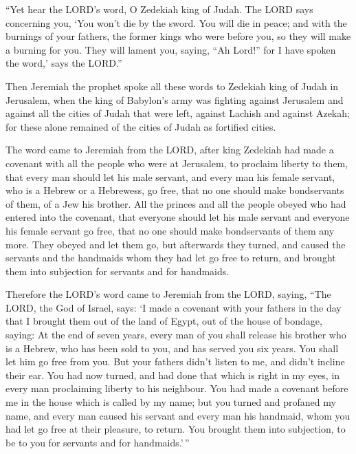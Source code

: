  ``Yet hear the LORD's word, O Zedekiah king of Judah. The
LORD says concerning you, `You won't die by the sword.  You
will die in peace; and with the burnings of your fathers, the former
kings who were before you, so they will make a burning for you. They
will lament you, saying, ``Ah Lord!'' for I have spoken the word,' says
the LORD.''

 Then Jeremiah the prophet spoke all these words to Zedekiah
king of Judah in Jerusalem,  when the king of Babylon's army
was fighting against Jerusalem and against all the cities of Judah that
were left, against Lachish and against Azekah; for these alone remained
of the cities of Judah as fortified cities.

 The word came to Jeremiah from the LORD, after king
Zedekiah had made a covenant with all the people who were at Jerusalem,
to proclaim liberty to them,  that every man should let his
male servant, and every man his female servant, who is a Hebrew or a
Hebrewess, go free, that no one should make bondservants of them, of a
Jew his brother.  All the princes and all the people obeyed
who had entered into the covenant, that everyone should let his male
servant and everyone his female servant go free, that no one should make
bondservants of them any more. They obeyed and let them go,
 but afterwards they turned, and caused the servants and
the handmaids whom they had let go free to return, and brought them into
subjection for servants and for handmaids.

 Therefore the LORD's word came to Jeremiah from the LORD,
saying,  ``The LORD, the God of Israel, says: `I made a
covenant with your fathers in the day that I brought them out of the
land of Egypt, out of the house of bondage, saying:  At the
end of seven years, every man of you shall release his brother who is a
Hebrew, who has been sold to you, and has served you six years. You
shall let him go free from you. But your fathers didn't listen to me,
and didn't incline their ear.  You had now turned, and had
done that which is right in my eyes, in every man proclaiming liberty to
his neighbour. You had made a covenant before me in the house which is
called by my name;  but you turned and profaned my name,
and every man caused his servant and every man his handmaid, whom you
had let go free at their pleasure, to return. You brought them into
subjection, to be to you for servants and for handmaids.'\,''

